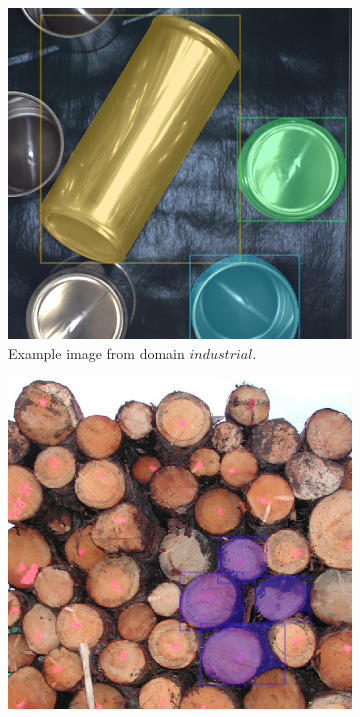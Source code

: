 \begin{figure}
\begin{subfigure}[t]{0.45\textwidth}
		\includegraphics[width=\textwidth]{figures/chap44_industrial1.png}
		\caption{
			Example image from domain $ industrial $.
		} \label{fig:ch4:sec4:domain_urban}
	\end{subfigure}
	\hfill
	\begin{subfigure}[t]{0.45\textwidth}
		\centering
		\includegraphics[width=\textwidth]{figures/chap44_industrial2.png}

\end{subfigure}
\end{figure}

